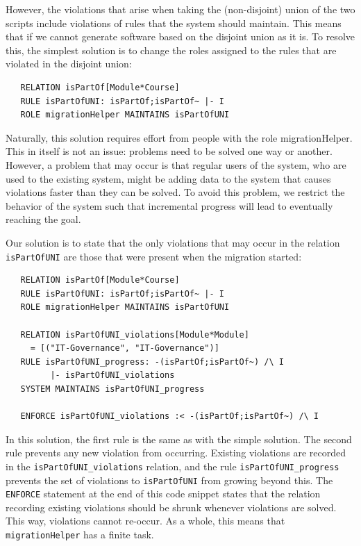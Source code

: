 \documentclass{elsarticle}
\begin{document}
However, the violations that arise when taking the (non-disjoint) union of the two scripts include violations of rules that the system should maintain.
This means that if we cannot generate software based on the disjoint union as it is.
To resolve this, the simplest solution is to change the roles assigned to the rules that are violated in the disjoint union:
\begin{verbatim}
   RELATION isPartOf[Module*Course]
   RULE isPartOfUNI: isPartOf;isPartOf~ |- I
   ROLE migrationHelper MAINTAINS isPartOfUNI
\end{verbatim}

Naturally, this solution requires effort from people with the role migrationHelper.
This in itself is not an issue: problems need to be solved one way or another.
However, a problem that may occur is that regular users of the system, who are used to the existing system, might be adding data to the system that causes violations faster than they can be solved.
To avoid this problem, we restrict the behavior of the system such that incremental progress will lead to eventually reaching the goal.

Our solution is to state that the only violations that may occur in the relation \verb=isPartOfUNI= are those that were present when the migration started:
\begin{verbatim}
   RELATION isPartOf[Module*Course]
   RULE isPartOfUNI: isPartOf;isPartOf~ |- I
   ROLE migrationHelper MAINTAINS isPartOfUNI
   
   RELATION isPartOfUNI_violations[Module*Module]
     = [("IT-Governance", "IT-Governance")]
   RULE isPartOfUNI_progress: -(isPartOf;isPartOf~) /\ I
         |- isPartOfUNI_violations
   SYSTEM MAINTAINS isPartOfUNI_progress
   
   ENFORCE isPartOfUNI_violations :< -(isPartOf;isPartOf~) /\ I  
\end{verbatim}

In this solution, the first rule is the same as with the simple solution.
The second rule prevents any new violation from occurring.
Existing violations are recorded in the \verb=isPartOfUNI_violations= relation, and the rule \verb=isPartOfUNI_progress= prevents the set of violations to \verb=isPartOfUNI= from growing beyond this.
The \verb=ENFORCE= statement at the end of this code snippet states that the relation recording existing violations should be shrunk whenever violations are solved.
This way, violations cannot re-occur.
As a whole, this means that \verb=migrationHelper= has a finite task.
\end{document}

